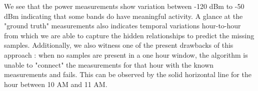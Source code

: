 We see that the power measurements show variation between -120 dBm to -50 dBm indicating that some bands do have meaningful activity.
 A glance at the "ground truth" measurements also indicates temporal variations hour-to-hour from which we are able to capture the hidden relationships to predict the missing samples.
 Additionally, we also witness one of the present drawbacks of this approach : when no samples are present in a one hour window, the algorithm is unable to "connect" the measurements for that hour with the known measurements and fails.
 This can be observed by the solid horizontal line for the hour between 10 AM and 11 AM.

